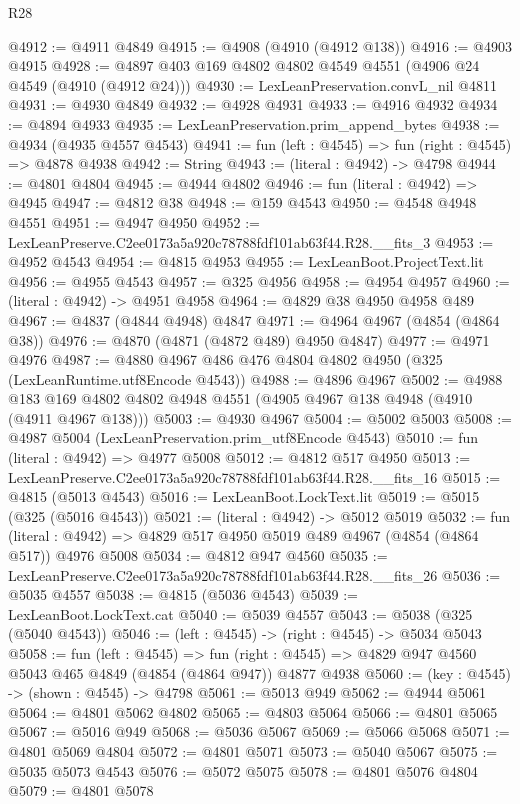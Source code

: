 \begin{lexlean}{R28}
\begin{coremodule}
@4912 := @4911 @4849
@4915 := @4908 (@4910 (@4912 @138))
@4916 := @4903 @4915
@4928 := @4897 @403 @169 @4802 @4802 @4549 @4551 (@4906 @24 @4549 (@4910 (@4912 @24)))
@4930 := LexLeanPreservation.convL_nil @4811
@4931 := @4930 @4849
@4932 := @4928 @4931
@4933 := @4916 @4932
@4934 := @4894 @4933
@4935 := LexLeanPreservation.prim_append_bytes
@4938 := @4934 (@4935 @4557 @4543)
@4941 := fun (left : @4545) => fun (right : @4545) => @4878 @4938
@4942 := String
@4943 := (literal : @4942) -> @4798
@4944 := @4801 @4804
@4945 := @4944 @4802
@4946 := fun (literal : @4942) => @4945
@4947 := @4812 @38
@4948 := @159 @4543
@4950 := @4548 @4948 @4551
@4951 := @4947 @4950
@4952 := LexLeanPreserve.C2ee0173a5a920c78788fdf101ab63f44.R28.__fits_3
@4953 := @4952 @4543
@4954 := @4815 @4953
@4955 := LexLeanBoot.ProjectText.lit
@4956 := @4955 @4543
@4957 := @325 @4956
@4958 := @4954 @4957
@4960 := (literal : @4942) -> @4951 @4958
@4964 := @4829 @38 @4950 @4958 @489
@4967 := @4837 (@4844 @4948) @4847
@4971 := @4964 @4967 (@4854 (@4864 @38))
@4976 := @4870 (@4871 (@4872 @489) @4950 @4847)
@4977 := @4971 @4976
@4987 := @4880 @4967 @486 @476 @4804 @4802 @4950 (@325 (LexLeanRuntime.utf8Encode @4543))
@4988 := @4896 @4967
@5002 := @4988 @183 @169 @4802 @4802 @4948 @4551 (@4905 @4967 @138 @4948 (@4910 (@4911 @4967 @138)))
@5003 := @4930 @4967
@5004 := @5002 @5003
@5008 := @4987 @5004 (LexLeanPreservation.prim_utf8Encode @4543)
@5010 := fun (literal : @4942) => @4977 @5008
@5012 := @4812 @517 @4950
@5013 := LexLeanPreserve.C2ee0173a5a920c78788fdf101ab63f44.R28.__fits_16
@5015 := @4815 (@5013 @4543)
@5016 := LexLeanBoot.LockText.lit
@5019 := @5015 (@325 (@5016 @4543))
@5021 := (literal : @4942) -> @5012 @5019
@5032 := fun (literal : @4942) => @4829 @517 @4950 @5019 @489 @4967 (@4854 (@4864 @517)) @4976 @5008
@5034 := @4812 @947 @4560
@5035 := LexLeanPreserve.C2ee0173a5a920c78788fdf101ab63f44.R28.__fits_26
@5036 := @5035 @4557
@5038 := @4815 (@5036 @4543)
@5039 := LexLeanBoot.LockText.cat
@5040 := @5039 @4557
@5043 := @5038 (@325 (@5040 @4543))
@5046 := (left : @4545) -> (right : @4545) -> @5034 @5043
@5058 := fun (left : @4545) =>
  fun (right : @4545) => @4829 @947 @4560 @5043 @465 @4849 (@4854 (@4864 @947)) @4877 @4938
@5060 := (key : @4545) -> (shown : @4545) -> @4798
@5061 := @5013 @949
@5062 := @4944 @5061
@5064 := @4801 @5062 @4802
@5065 := @4803 @5064
@5066 := @4801 @5065
@5067 := @5016 @949
@5068 := @5036 @5067
@5069 := @5066 @5068
@5071 := @4801 @5069 @4804
@5072 := @4801 @5071
@5073 := @5040 @5067
@5075 := @5035 @5073 @4543
@5076 := @5072 @5075
@5078 := @4801 @5076 @4804
@5079 := @4801 @5078

\end{coremodule}
\end{lexlean}
